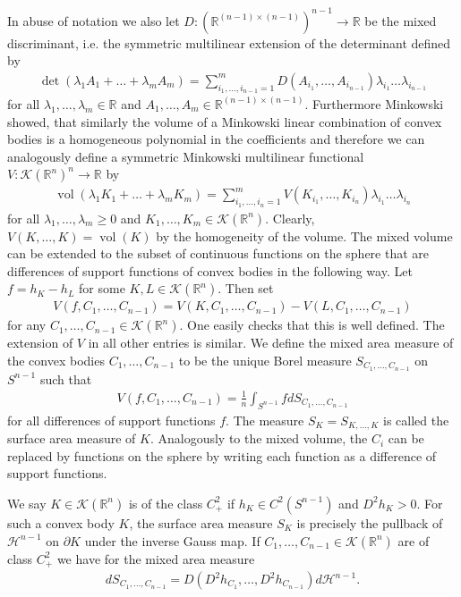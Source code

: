 \documentclass[12pt,twoside]{amsart}
\numberwithin{satz}{section}
\theoremstyle{definition}
\numberwithin{equation}{section}
\newcommand\R{\mathbb{R}}
\newcommand\vol{\operatorname{vol}}
\newcommand\Kc{\mathcal{K}}
\begin{document}
	In abuse of notation we also let $D:(\R^{(n-1)\times(n-1)})^{n-1}\to\R$ be the mixed discriminant, i.e. the symmetric multilinear extension of the determinant defined by
	\begin{align*}
		\det(\lambda_1A_1+\dots+\lambda_mA_m)=\sum_{i_1,\dots,i_{n-1}=1}^{m}D(A_{i_1},\dots,A_{i_{n-1}})\lambda_{i_1}\dots\lambda_{i_{n-1}}
	\end{align*}
	for all $\lambda_1,\dots,\lambda_m\in\R$ and $A_1,\dots,A_m\in\R^{(n-1)\times(n-1)}$. Furthermore Minkowski showed, that similarly the volume of a Minkowski linear combination of convex bodies is a homogeneous polynomial in the coefficients and therefore we can analogously define a symmetric Minkowski multilinear functional $V:\Kc(\R^n)^n\to \R$ by
	\begin{align*}
		\vol(\lambda_1K_1+\dots+\lambda_mK_m)=\sum_{i_1,\dots,i_n=1}^m V(K_{i_1},\dots,K_{i_n})\lambda_{i_1}\dots\lambda_{i_n}
	\end{align*}
	for all $\lambda_1,\dots,\lambda_m\geq 0$ and $K_1,\dots,K_m\in\Kc(\R^n)$. Clearly, $V(K,\dots,K)=\vol(K)$ by the homogeneity of the volume. The mixed volume can be extended to the subset of continuous functions on the sphere that are differences of support functions of convex bodies in the following way. Let $f=h_K-h_L$ for some $K,L\in\Kc(\R^n)$. Then set
	\begin{align*}
		V(f,C_1,\dots,C_{n-1})=V(K,C_1,\dots,C_{n-1})-V(L,C_1,\dots,C_{n-1})
	\end{align*}
	for any $C_1,\dots,C_{n-1}\in\Kc(\R^n)$. One easily checks that this is well defined. The extension of $V$ in all other entries is similar. We define the mixed area measure of the convex bodies $C_1,\dots,C_{n-1}$ to be the unique Borel measure $S_{C_1,\dots,C_{n-1}}$ on $S^{n-1}$ such that
	\begin{align*}
		V(f,C_1,\dots,C_{n-1})=\frac{1}{n}\int_{S^{n-1}} f dS_{C_1,\dots,C_{n-1}}
	\end{align*}
	for all differences of support functions $f$. The measure $S_K=S_{K,\dots,K}$ is called the surface area measure of $K$. Analogously to the mixed volume, the $C_i$ can be replaced by functions on the sphere by writing each function as a difference of support functions.
	
	We say $K\in \Kc(\R^n)$ is of the class $C^2_+$ if $h_K\in C^2(S^{n-1})$ and $D^2h_K>0$. For such a convex body $K$, the surface area measure $S_K$ is precisely the pullback of $\mathcal{H}^{n-1}$ on $\partial K$ under the inverse Gauss map. If $C_1,\dots,C_{n-1}\in\Kc(\R^n)$ are of class $C^2_+$ we have for the mixed area measure
	\begin{align*}
		dS_{C_1,\dots,C_{n-1}}=D(D^2h_{C_1},\dots,D^2h_{C_{n-1}})d\mathcal{H}^{n-1}.
	\end{align*}
	
\end{document}
